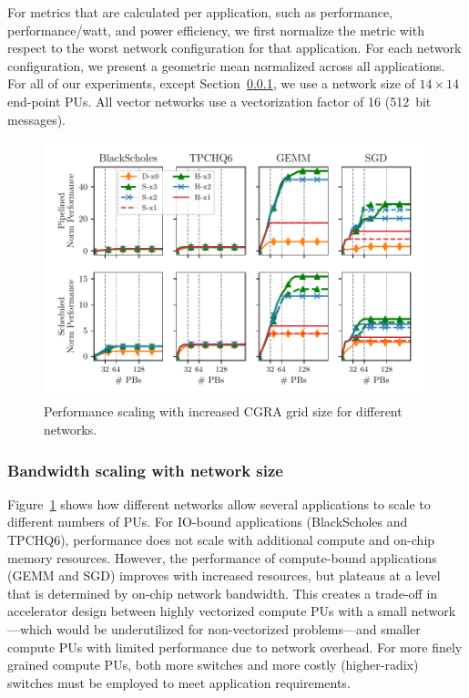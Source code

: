For metrics that are calculated per application, such as performance, performance/watt, and power efficiency, we first normalize the metric with respect to the 
worst network configuration for that application. 
For each network configuration, we present a geometric mean normalized across all applications. 
For all of our experiments, except Section~\ref{sec:scale}, we use a network
size of $14\times14$ end-point PUs. All vector networks use a vectorization factor of 16 (\SI{512}{bit} messages).

\begin{figure}
\centering
\includegraphics[width=1\columnwidth]{figs/scale.pdf}
\caption{Performance scaling with increased CGRA grid size for different networks.}\label{fig:scale}
\end{figure}
\subsubsection{Bandwidth scaling with network size}\label{sec:scale}
Figure~\ref{fig:scale} shows how different networks allow several applications to scale to different numbers of PUs.
For IO-bound applications (BlackScholes and TPCHQ6), performance does not scale with additional compute and on-chip memory resources.
However, the performance of compute-bound applications (GEMM and SGD) improves with increased resources, but plateaus at a level that is determined by on-chip network bandwidth. 
This creates a trade-off in accelerator design between highly vectorized compute PUs with a small network---which would be underutilized for non-vectorized problems---and smaller compute PUs with limited performance due to network overhead. 
For more finely grained compute PUs, both more switches and more costly (higher-radix) switches must be employed to meet application requirements.

